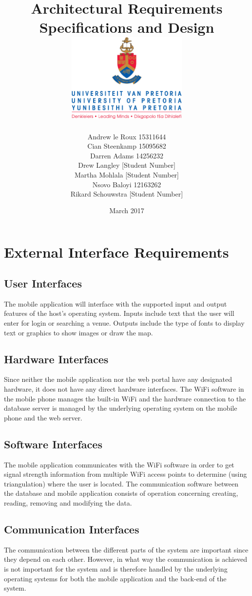 \documentclass{article}
\title{ Architectural Requirements Specifications and Design \\[0.5cm] \includegraphics[width=6cm]{front-page}}
\author{Andrew le Roux \hfill 15311644 \\ Cian Steenkamp \hfill 15095682 \\ Darren Adams \hfill 14256232 \\ Drew Langley \hfill [Student Number] \\ Martha Mohlala \hfill [Student Number] \\ Nsovo Baloyi \hfill 12163262 \\ Rikard Schouwstra \hfill [Student Number]}
\date{March 2017}
\begin{document}
\maketitle
\pagebreak
\tableofcontents
\pagebreak

\section{External Interface Requirements}
    \subsection{User Interfaces}
        The mobile application will interface with the supported input and output
        features of the host's operating system. Inputs include text that the user
        will enter for login or searching a venue. Outputs include the type of fonts
        to display text or graphics to show images or draw the map.

    \subsection{Hardware Interfaces}
        Since neither the mobile application nor the web portal have any designated
        hardware, it does not have any direct hardware interfaces. The WiFi software
        in the mobile phone manages the built-in WiFi and the hardware connection
        to the database server is managed by the underlying operating system on the
        mobile phone and the web server.

    \subsection{Software Interfaces}
        The mobile application communicates with the WiFi software in order to get
        signal strength information from multiple WiFi access points to determine
        (using triangulation) where the user is located. The communication software
        between the database and mobile application consists of operation concerning
        creating, reading, removing and modifying the data.

    \subsection{Communication Interfaces}
        The communication between the different parts of the system are important since they depend on each other. However, in what way the communication is achieved is not important for the system and is therefore handled by the underlying operating systems for both the mobile application and the back-end of the system.
\end{document}
